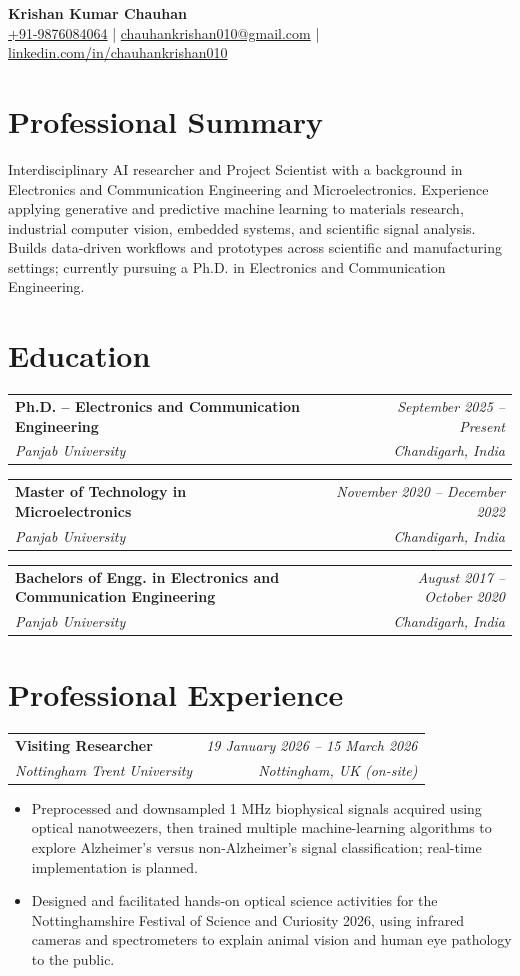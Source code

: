 \documentclass[a4paper,11pt]{article}
\makeatletter
\newif\ifCVShowLinkIcons
\newcommand{\cvPhoneIcon}{}
\newcommand{\cvEmailIcon}{}
\newcommand{\cvLinkedinIcon}{}
\newcommand{\cvExternalLinkIcon}{}
\renewcommand{\cvPhoneIcon}{\faPhone\hspace{0.12cm}}
\renewcommand{\cvEmailIcon}{\faEnvelope\hspace{0.12cm}}
\renewcommand{\cvLinkedinIcon}{\faLinkedinIn\hspace{0.12cm}}
\renewcommand{\cvExternalLinkIcon}{\raisebox{.15ex}{\footnotesize\faExternalLink*}}
\let\hrefWithoutArrow\href
\renewcommand{\href}[2]{%
  \hrefWithoutArrow{#1}{#2\ifCVShowLinkIcons\hspace{0.12em}\cvExternalLinkIcon\fi}%
}
\newcommand{\roleentry}[4]{%
  \begin{tabular*}{\textwidth}{@{}l@{\extracolsep{\fill}}r@{}}
    \textbf{#1} & \textit{#2} \\
    \textit{#3} & \textit{#4} \\
  \end{tabular*}\par\vspace{-3pt}%
}
\newcommand{\cvbullet}[1]{\item #1}
\makeatother
\begin{document}
\begin{center}
  {\LARGE\textbf{Krishan Kumar Chauhan}}\\[3pt]
  \cvPhoneIcon\href{tel:+91-9876084064}{+91-9876084064} \quad | \quad
  \cvEmailIcon\href{mailto:chauhankrishan010@gmail.com}{chauhankrishan010@gmail.com} \quad | \quad
  \cvLinkedinIcon\href{https://www.linkedin.com/in/chauhankrishan010/}{linkedin.com/in/chauhankrishan010}
\end{center}
\vspace{-5pt}

\section*{Professional Summary}
Interdisciplinary AI researcher and Project Scientist with a background in Electronics and Communication Engineering and Microelectronics. Experience applying generative and predictive machine learning to materials research, industrial computer vision, embedded systems, and scientific signal analysis. Builds data-driven workflows and prototypes across scientific and manufacturing settings; currently pursuing a Ph.D. in Electronics and Communication Engineering.

\section*{Education}
\roleentry{Ph.D. -- Electronics and Communication Engineering}{September 2025 -- Present}{Panjab University}{Chandigarh, India}
\roleentry{Master of Technology in Microelectronics}{November 2020 -- December 2022}{Panjab University}{Chandigarh, India}
\roleentry{Bachelors of Engg. in Electronics and Communication Engineering}{August 2017 -- October 2020}{Panjab University}{Chandigarh, India}

\section*{Professional Experience}

\roleentry{Visiting Researcher}{19 January 2026 -- 15 March 2026}{Nottingham Trent University}{Nottingham, UK (on-site)}
\begin{itemize}
  \cvbullet{Preprocessed and downsampled 1 MHz biophysical signals acquired using optical nanotweezers, then trained multiple machine-learning algorithms to explore Alzheimer's versus non-Alzheimer's signal classification; real-time implementation is planned.}
  \cvbullet{Designed and facilitated hands-on optical science activities for the Nottinghamshire Festival of Science and Curiosity 2026, using infrared cameras and spectrometers to explain animal vision and human eye pathology to the public.}
\end{itemize}
\end{document}
